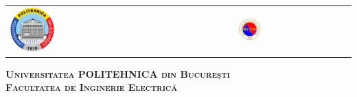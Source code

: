 



\begin{titlepage}
	\centering
	\begin{tabular}{p{6cm}p{3.3cm}}
		\includegraphics[width=0.2\textwidth]{img/upb.png} &
		\includegraphics[width=0.2\textwidth]{img/fie.png}
	\end{tabular}
	\vspace{1cm}

	{\scshape\Large \textbf{Universitatea POLITEHNICA din București} \\}
	{\scshape\Large \textbf{Facultatea de Inginerie Electrică} \\}
	
\end{titlepage}

